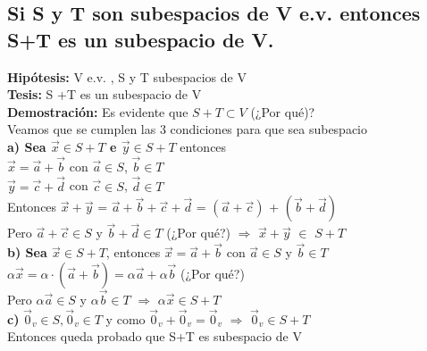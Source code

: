\documentclass[11pt]{article}
\begin{document}
\subsection{Si S y T son subespacios de V e.v. entonces S+T es un
subespacio de V.}
{\bfseries {Hipótesis:}} V e.v. , S y T subespacios de V \\
{\bfseries {Tesis:}} S +T es un subespacio de V\\
{\bfseries {Demostración:}} Es evidente que $S + T \subset V$ (¿Por qué)?\\
Veamos que se cumplen las 3 condiciones para que sea subespacio\\
{\bfseries {a) Sea $\vec{x} \in S+T$ e $\vec{y} \in S+T$}} entonces\\
$\vec{x} = \vec{a} + \vec{b}$ con $\vec{a} \in S$, $\vec{b} \in T$\\
$\vec{y} = \vec{c} + \vec{d}$ con $\vec{c} \in S$, $\vec{d} \in T$\\
Entonces $\vec{x} + \vec{y}$ = $\vec{a}+\vec{b}+\vec{c}+\vec{d}$ = $(\vec{a} + \vec{c}) $ + $(\vec{b} + \vec{d})$\\
Pero $\vec{a}+\vec{c} \in S$ y $\vec{b}+\vec{d} \in T$ (¿Por qué?) $\Rightarrow$ $\vec{x} + \vec{y} $ $\in$ $ S + T $ \\
{\bfseries {b) Sea $\vec{x} \in S+T$}}, entonces $\vec{x} = \vec{a} + \vec{b} $ con $ \vec{a} \in S$ y $\vec{b} \in T$\\
$\alpha\vec{x} = \alpha\cdot (\vec{a} + \vec{b}) = \alpha\vec{a} + \alpha\vec{b}$ (¿Por qué?)\\
Pero $\alpha\vec{a} \in S$ y $\alpha\vec{b} \in T$ $\Rightarrow$ $\alpha\vec{x} \in S+T$\\
{\bfseries {c)}} $\vec{0}_v \in S, \vec{0}_v \in T$ y como $\vec{0}_v + \vec{0}_v = \vec{0}_v$ $\Rightarrow$ $\vec{0}_v \in S+T$\\
Entonces queda probado que S+T es subespacio de V
\end{document}
